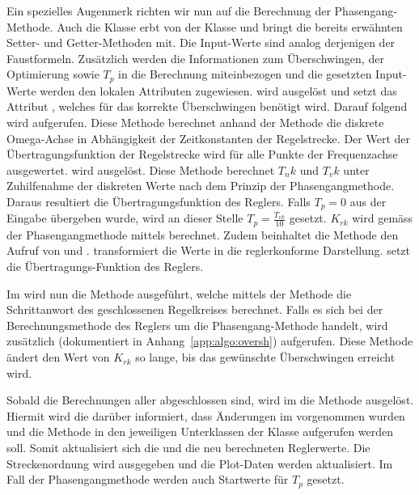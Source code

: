 Ein   spezielles  Augenmerk   richten   wir  nun   auf   die  Berechnung   der
Phasengang-Methode. Auch  die   Klasse     erbt  von
der  Klasse    und  bringt die  bereits  erw\"ahnten  Setter-
und   Getter-Methoden  mit. Die   Input-Werte  sind   analog  derjenigen   der
Faustformeln. Zus\"atzlich  werden  die   Informationen  zum  \"Uberschwingen,
der   Optimierung   sowie   $T_p$   in  die   Berechnung   miteinbezogen   und
die   gesetzten  Input-Werte   werden  den   lokalen  Attributen   zugewiesen.
   wird   ausgel\"ost   und  setzt   das   Attribut
,   welches   f\"ur   das   korrekte   \"Uberschwingen   ben\"otigt
wird. Darauf   folgend  wird     aufgerufen. Diese   Methode
berechnet   anhand   der   Methode      die   diskrete
Omega-Achse  in  Abh\"angigkeit  der  Zeitkonstanten  der  Regelstrecke.   Der
Wert  der  \"Ubertragungsfunktion  der  Regelstrecke wird  f\"ur  alle  Punkte
der Frequenzachse  ausgewertet.   wird ausgel\"ost. Diese
Methode  berechnet   $T_nk$  und  $T_vk$  unter   Zuhilfenahme  der  diskreten
Werte   nach  dem   Prinzip  der   Phasengangmethode. Daraus  resultiert   die
\"Ubertragungsfunktion  des   Reglers. Falls  $T_p   =  0$  aus   der  Eingabe
\"ubergeben   wurde,  wird   an  dieser   Stelle  $T_p   =  \frac{T_{vk}}{10}$
gesetzt. $K_{rk}$    wird     gem\"ass    der     Phasengangmethode    mittels
     berechnet. Zudem      beinhaltet     die     Methode
   den    Aufruf   von   
und   .     transformiert   die
Werte   in  die   reglerkonforme   Darstellung.     setzt   die
\"Ubertragungs-Funktion des Reglers.

Im        wird    nun    die    Methode    
ausgef\"uhrt,  welche   mittels  der   Methode  
die   Schrittanwort  des   geschlossenen   Regelkreises  berechnet. Falls   es
sich  bei  der  Berechnungsmethode   des  Reglers  um  die  Phasengang-Methode
handelt,  wird  zus\"atzlich   (dokumentiert  in
Anhang~\ref{app:algo:oversh}) aufgerufen. Diese Methode  \"andert den Wert von
$K_{rk}$ so lange, bis das gew\"unschte \"Uberschwingen erreicht wird.

Sobald die  Berechnungen aller  abgeschlossen  sind, wird im
  die  Methode   ausgel\"ost. Hiermit  wird
die    dar\"uber  informiert,  dass  \"Anderungen  im  
vorgenommen  wurden   und  die  Methode     in  den  jeweiligen
Unterklassen der Klasse  aufgerufen werden soll. Somit aktualisiert
sich die  und  die neu berechneten Reglerwerte. Die Streckenordnung
wird  ausgegeben   und  die   Plot-Daten  werden  aktualisiert. Im   Fall  der
Phasengangmethode werden auch Startwerte f\"ur $T_p$ gesetzt.

